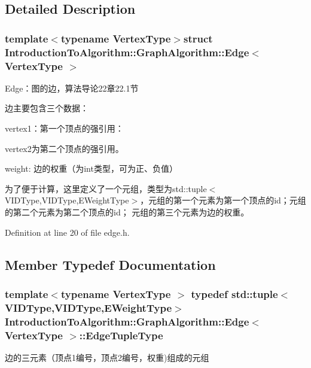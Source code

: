 \subsection{Detailed Description}
\subsubsection*{template$<$typename Vertex\+Type$>$struct Introduction\+To\+Algorithm\+::\+Graph\+Algorithm\+::\+Edge$<$ Vertex\+Type $>$}

Edge：图的边，算法导论22章22.1节 

边主要包含三个数据：


\begin{DoxyItemize}
\item {\ttfamily vertex1}：第一个顶点的强引用：
\item {\ttfamily vertex2}为第二个顶点的强引用。
\item {\ttfamily weight}\+: 边的权重（为int类型，可为正、负值）
\end{DoxyItemize}

为了便于计算，这里定义了一个元组，类型为{\ttfamily std\+::tuple$<$V\+I\+D\+Type,V\+I\+D\+Type,E\+Weight\+Type$>$}，元组的第一个元素为第一个顶点的{\ttfamily id}；元组的第二个元素为第二个顶点的{\ttfamily id}； 元组的第三个元素为边的权重。 

Definition at line 20 of file edge.\+h.



\subsection{Member Typedef Documentation}
\hypertarget{struct_introduction_to_algorithm_1_1_graph_algorithm_1_1_edge_a2eb9ac670ab79db90876e60538615858}{}
\subsubsection[{Edge\+Tuple\+Type}]{\setlength{\rightskip}{0pt plus 5cm}template$<$typename Vertex\+Type $>$ typedef std\+::tuple$<${\bf V\+I\+D\+Type},{\bf V\+I\+D\+Type},{\bf E\+Weight\+Type}$>$ {\bf Introduction\+To\+Algorithm\+::\+Graph\+Algorithm\+::\+Edge}$<$ Vertex\+Type $>$\+::{\bf Edge\+Tuple\+Type}}\label{struct_introduction_to_algorithm_1_1_graph_algorithm_1_1_edge_a2eb9ac670ab79db90876e60538615858}
边的三元素（顶点1编号，顶点2编号，权重)组成的元组 

